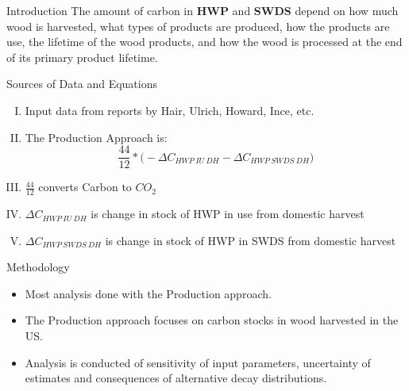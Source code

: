 \documentclass[final]{beamer}\usepackage[]{graphicx}\usepackage[]{color}
\newlength{\onecolwid}
\begin{document}
\begin{frame}[t]
\begin{columns}[t]
\begin{column}{\onecolwid}
\begin{block}{Introduction}
The amount of carbon in \textbf{HWP} and \textbf{SWDS} depend on how much wood is harvested, what types of products are produced, how the products are use, the lifetime of the wood products, and how the wood is processed at the end of its primary product lifetime.



\end{block}


\begin{block}{Sources of Data and Equations}

\begin{enumerate}[I.]
\item Input data from reports by Hair, Ulrich, Howard, Ince, etc. 
\vspace{.3ex}
\item The Production Approach is:  
\begin{equation}
\frac{44}{12} * \Big(-\Delta C_{HWP\:IU\:DH} - \Delta C_{HWP\:SWDS\:DH}\Big)
\label{eqn:Einstein}
\end{equation}
\vspace{.3ex}
\item $\frac{44}{12}$ converts Carbon to $CO_2$
\vspace{.3ex}
\item $\Delta C_{HWP\:IU\:DH}$ is change in stock of HWP in use from 
domestic harvest 
\vspace{.3ex}
\item $\Delta C_{HWP\:SWDS\:DH}$ is change in stock of HWP in SWDS
from domestic harvest 
\end{enumerate}
\vspace{.3ex}
\end{block}
\vfill

\begin{block}{Methodology}
\begin{itemize}
\item Most analysis done with the Production approach.
\vspace{.5ex}
\item The Production approach focuses on carbon stocks in wood harvested in the US.
\vspace{.5ex}
\item Analysis is conducted of sensitivity of input parameters, uncertainty of estimates
and consequences of alternative decay distributions. 
\end{itemize}
\vspace{.3ex}
\vfill
\end{block}


\end{column}
\end{columns}
\end{frame}
\end{document}
